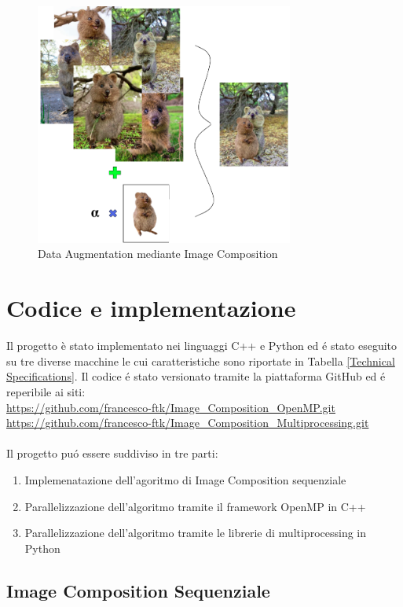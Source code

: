 \documentclass{article}
\begin{document}
\begin{figure}[!h]
\centering
\includegraphics[width= 8.5cm]{"Immagini/Images.PNG"}
\caption{Data Augmentation mediante Image Composition}
\label{Images}
\end{figure}

\newpage

\section{Codice e implementazione}

Il progetto è stato implementato nei linguaggi C++ e Python ed \'e stato eseguito su tre diverse macchine le cui caratteristiche sono riportate in Tabella \ref{Technical Specifications}. Il codice \'e stato versionato tramite la piattaforma GitHub ed \'e reperibile ai siti:\\
\url{https://github.com/francesco-ftk/Image_Composition_OpenMP.git} \\
\url{https://github.com/francesco-ftk/Image_Composition_Multiprocessing.git}\\
\\
\noindent Il progetto pu\'o essere suddiviso in tre parti:
\begin{enumerate}
\item Implemenatazione dell'agoritmo di Image Composition sequenziale
\item Parallelizzazione dell'algoritmo tramite il framework OpenMP in C++
\item Parallelizzazione dell'algoritmo tramite le librerie di multiprocessing in Python
\end{enumerate}

\subsection{Image Composition Sequenziale}
\end{document}

